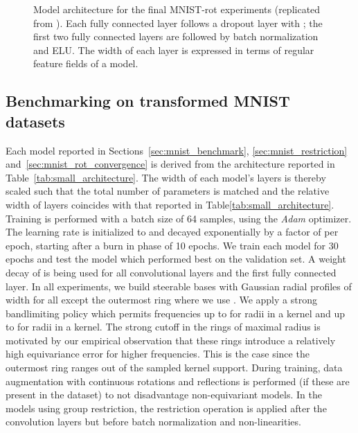 \documentclass{article}
\begin{document}
{{\begin{figure}[H]
\begin{minipage}{\linewidth}
\begin{minipage}{0.45\linewidth}
\begin{table}[H]
{                }
                \vspace*{4pt}
                \caption{
                    Model architecture for the final MNIST-rot experiments (replicated from \cite{Weiler2018-STEERABLE}).
                    Each fully connected layer follows a dropout layer with ; the first two fully connected layers are followed by batch normalization and ELU.
                    The width of each layer is expressed in terms of regular feature fields of a  model.
                }
                \vspace*{10pt}
                \label{tab:large_architecture}
            \end{table}  
        \end{minipage}
    \end{minipage}
    \vspace*{-12pt}
\end{figure}


\subsection{Benchmarking on transformed MNIST datasets}
\label{apx:mnist_benchmark_training}

Each model reported in Sections~\ref{sec:mnist_benchmark}, \ref{sec:mnist_restriction} and~\ref{sec:mnist_rot_convergence} is derived from the architecture reported in Table~\ref{tab:small_architecture}.
The width of each model's layers is thereby scaled such that the total number of parameters is matched and the relative width of layers coincides with that reported in Table\ref{tab:small_architecture}.
Training is performed with a batch size of 64 samples, using the \emph{Adam} optimizer.
The learning rate is initialized to  and decayed exponentially by a factor of  per epoch, starting after a burn in phase of 10 epochs.
We train each model for 30 epochs and test the model which performed best on the validation set.
A weight decay of  is being used for all convolutional layers and the first fully connected layer.
In all experiments, we build steerable bases with Gaussian radial profiles of width  for all except the outermost ring where we use .
We apply a strong bandlimiting policy which permits frequencies up to  for radii  in a  kernel and up to  for radii  in a  kernel.
The strong cutoff in the rings of maximal radius is motivated by our empirical observation that these rings introduce a relatively high equivariance error for higher frequencies.
This is the case since the outermost ring ranges out of the sampled kernel support.
During training, data augmentation with continuous rotations and reflections is performed (if these are present in the dataset) to not disadvantage non-equivariant models.
In the models using group restriction, the restriction operation is applied after the convolution layers but before batch normalization and non-linearities.




}}
\end{document}
